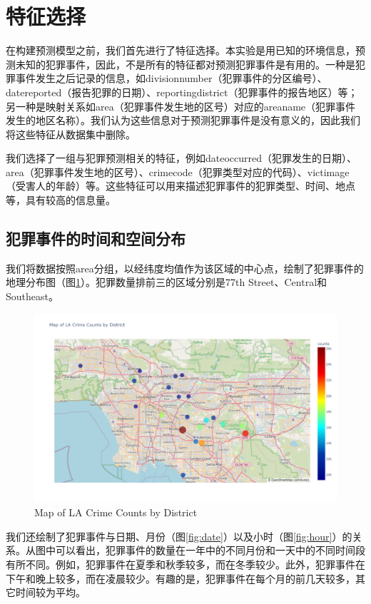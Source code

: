 \documentclass{article}
\begin{document}
\section{特征选择}
在构建预测模型之前，我们首先进行了特征选择。本实验是用已知的环境信息，预测未知的犯罪事件，因此，不是所有的特征都对预测犯罪事件是有用的。一种是犯罪事件发生之后记录的信息，如division\textunderscore{}number（犯罪事件的分区编号）、date\textunderscore{}reported（报告犯罪的日期）、reporting\textunderscore{}district（犯罪事件的报告地区）等；另一种是映射关系如area（犯罪事件发生地的区号）对应的area\textunderscore{}name（犯罪事件发生的地区名称）。我们认为这些信息对于预测犯罪事件是没有意义的，因此我们将这些特征从数据集中删除。

我们选择了一组与犯罪预测相关的特征，例如date\textunderscore{}occurred（犯罪发生的日期）、area（犯罪事件发生地的区号）、crime\textunderscore{}code（犯罪类型对应的代码）、victim\textunderscore{}age（受害人的年龄）等。这些特征可以用来描述犯罪事件的犯罪类型、时间、地点等，具有较高的信息量。

\subsection{犯罪事件的时间和空间分布}
我们将数据按照area分组，以经纬度均值作为该区域的中心点，绘制了犯罪事件的地理分布图（图\ref{fig:map}）。犯罪数量排前三的区域分别是77th Street、Central和Southeast。

\begin{figure}[H]
    \centering
    \includegraphics[width=1\textwidth]{../pic/map.png}
    \caption{Map of LA Crime Counts by District}
    \label{fig:map}
\end{figure}

我们还绘制了犯罪事件与日期、月份（图\ref{fig:date}）以及小时（图\ref{fig:hour}）的关系。从图中可以看出，犯罪事件的数量在一年中的不同月份和一天中的不同时间段有所不同。例如，犯罪事件在夏季和秋季较多，而在冬季较少。此外，犯罪事件在下午和晚上较多，而在凌晨较少。有趣的是，犯罪事件在每个月的前几天较多，其它时间较为平均。
\end{document}
